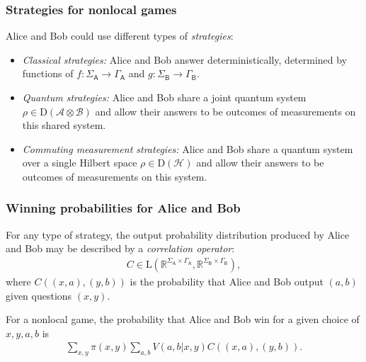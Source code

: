 \documentclass{beamer}
\def\A{\mathcal{A}}
\def\B{\mathcal{B}}
\def\H{\mathcal{H}}
\def\real{\mathbb{R}}
\def \GammaA{\Gamma_{\reg{A}}}
\def \GammaB{\Gamma_{\reg{B}}}
\def \SigmaA{\Sigma_{\reg{A}}}
\def \SigmaB{\Sigma_{\reg{B}}}
\newcommand{\setft}[1]{\mathrm{#1}}
\newcommand{\Density}{\setft{D}}
\newcommand{\Lin}{\setft{L}}
\newcommand{\reg}[1]{\mathsf{#1}}
\begin{document}
\begin{frame}
	\frametitle{Strategies for nonlocal games}
	Alice and Bob could use different types of \emph{strategies}:
	\vspace{2mm}
	\begin{itemize}
		\item \emph{Classical strategies:} Alice and Bob answer deterministically, determined by functions of $f : \SigmaA \rightarrow \GammaA$ and $g : \SigmaB \rightarrow \GammaB$.
		\vspace{5mm}
		\item \emph{Quantum strategies:} Alice and Bob share a joint quantum system $\rho \in \Density(\A \otimes \B)$ and allow their answers to be outcomes of measurements on this shared system.		
		\vspace{5mm}
		\item \emph{Commuting measurement strategies:} Alice and Bob share a quantum system over a single Hilbert space $\rho \in \Density(\H)$ and allow their answers to be outcomes of measurements on this system. 
	\end{itemize}
\end{frame}

\begin{frame}
	\frametitle{Winning probabilities for Alice and Bob}
	For any type of strategy, the output probability distribution produced by Alice and Bob may be described by a \emph{correlation operator}:
	\begin{align*}
		C \in \Lin(\real^{\SigmaA \times \GammaA}, \real^{\SigmaB \times \GammaB}),
	\end{align*}
where $C((x,a),(y,b))$ is the probability that Alice and Bob output $(a,b)$ given questions $(x,y)$. 
\pause
\vspace{5mm}

For a nonlocal game, the probability that Alice and Bob win for a given choice of $x,y,a,b$ is 
\begin{align*}
	\sum_{x,y} \pi(x,y) \sum_{a,b} V(a,b|x,y) C((x,a), (y,b)).
\end{align*}
\end{frame}
\end{document}
